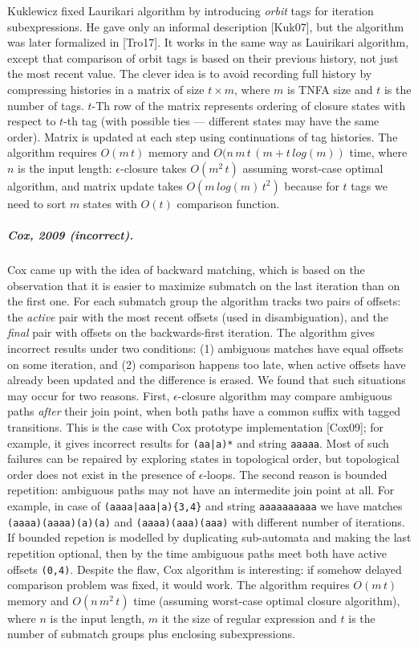 \documentclass[AMA,STIX1COL]{WileyNJD-v2}
\begin{document}
Kuklewicz fixed Laurikari algorithm by introducing \emph{orbit} tags for iteration subexpressions.
He gave only an informal description [Kuk07], but the algorithm was later formalized in [Tro17].
It works in the same way as Lauirikari algorithm,
except that comparison of orbit tags is based on their previous history, not just the most recent value.
The clever idea is to avoid recording full history
by compressing histories in a matrix of size $t \times m$, where $m$ is TNFA size and $t$ is the number of tags.
$t$-Th row of the matrix represents ordering of closure states with respect to $t$-th tag
(with possible ties --- different states may have the same order).
Matrix is updated at each step using continuations of tag histories.
The algorithm requires $O(m \, t)$ memory and $O(n \, m \, t \, (m + t \, log(m))$ time, where $n$ is the input length:
$\epsilon$-closure takes $O(m^2 \, t)$ assuming worst-case optimal algorithm,
and matrix update takes $O(m \, log(m) \, t^2)$ because for $t$ tags we need to sort $m$ states with $O(t)$ comparison function.

\subparagraph{Cox, 2009 (incorrect).}

Cox came up with the idea of backward matching,
which is based on the observation that it is easier to maximize submatch on the last iteration than on the first one.
For each submatch group the algorithm tracks two pairs of offsets:
the \emph{active} pair with the most recent offsets (used in disambiguation),
and the \emph{final} pair with offsets on the backwards-first iteration.
The algorithm gives incorrect results under two conditions:
(1) ambiguous matches have equal offsets on some iteration,
and (2) comparison happens too late, when active offsets have already been updated and the difference is erased.
We found that such situations may occur for two reasons.
First, $\epsilon$-closure algorithm may compare ambiguous paths \emph{after} their join point,
when both paths have a common suffix with tagged transitions.
This is the case with Cox prototype implementation [Cox09]; for example, it gives incorrect results for \texttt{(aa|a)*} and string \texttt{aaaaa}.
Most of such failures can be repaired by exploring states in topological order,
but topological order does not exist in the presence of $\epsilon$-loops.
The second reason is bounded repetition: ambiguous paths may not have an intermedite join point at all.
For example, in case of \texttt{(aaaa|aaa|a)\{3,4\}} and string \texttt{aaaaaaaaaa}
we have matches \texttt{(aaaa)(aaaa)(a)(a)} and \texttt{(aaaa)(aaa)(aaa)}
with different number of iterations.
If bounded repetion is modelled by duplicating sub-automata and making the last repetition optional,
then by the time ambiguous paths meet both have active offsets \texttt{(0,4)}.
Despite the flaw, Cox algorithm is interesting: if somehow delayed comparison problem was fixed, it would work.
The algorithm requires $O(m \, t)$ memory and $O(n \, m^2 \, t)$ time
(assuming worst-case optimal closure algorithm),
where $n$ is the input length,
$m$ it the size of regular expression
and $t$ is the number of submatch groups plus enclosing subexpressions.
\end{document}
